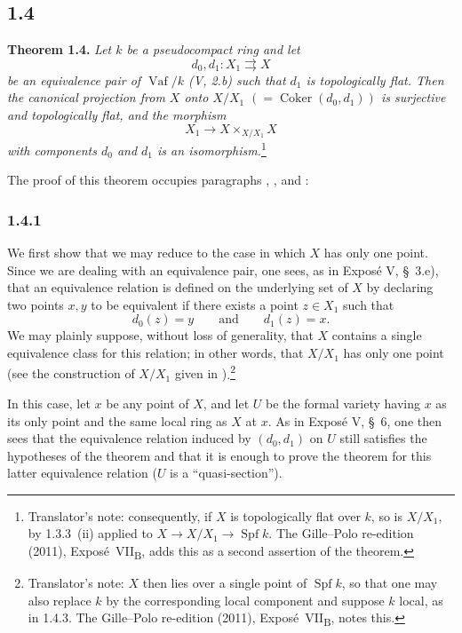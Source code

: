 
\subsection*{1.4}
\label{sga3:VIIB:1.4}

\noindent\textbf{Theorem 1.4.}
\label{sga3:VIIB:1.4.thm}
{\itshape Let \(k\) be a pseudocompact ring and let
\[
  d_0,d_1:X_1\rightrightarrows X
\]
be an equivalence pair of \(\operatorname{Vaf}/k\)
\textup{(V, 2.b)} such that \(d_1\) is topologically flat. Then the
canonical projection from \(X\) onto
\(X/X_1\) \(({}=\operatorname{Coker}(d_0,d_1))\) is surjective and
topologically flat, and the morphism
\[
  X_1\longrightarrow X\times_{X/X_1}X
\]
with components \(d_0\) and \(d_1\) is an isomorphism.}\footnote{Translator's note: consequently, if
\(X\) is topologically flat over \(k\), so is \(X/X_1\), by 1.3.3~(ii) applied to
\(X\to X/X_1\to\operatorname{Spf}k\). The Gille--Polo re-edition (2011), Expos\'e~VII\textsubscript{B}, adds
this as a second assertion of the theorem.}

The proof of this theorem occupies paragraphs ,
, and :

\subsubsection*{1.4.1}
\label{sga3:VIIB:1.4.1}

We first show that we may reduce to the case in which \(X\) has only
one point. Since we are dealing with an equivalence pair, one sees,
as in Expos\'e V, \S~3.e), that an equivalence relation is defined on
the underlying set of \(X\) by declaring two points \(x,y\) to be
equivalent if there exists a point \(z\in X_1\) such that
\[
  d_0(z)=y
  \qquad\text{and}\qquad
  d_1(z)=x.
\]
We may plainly suppose, without loss of generality, that \(X\)
contains a single equivalence class for this relation; in other words,
that \(X/X_1\) has only one point \textup{(see the construction of
\(X/X_1\) given in )}.\footnote{Translator's note: \(X\) then lies over a
single point of \(\operatorname{Spf}k\), so that one may also replace \(k\) by the corresponding local
component and suppose \(k\) local, as in 1.4.3. The Gille--Polo re-edition (2011),
Expos\'e~VII\textsubscript{B}, notes this.}

In this case, let \(x\) be any point of \(X\), and let \(U\) be the
formal variety having \(x\) as its only point and the same local ring
as \(X\) at \(x\). As in Expos\'e V, \S~6, one then sees that the
equivalence relation induced by \((d_0,d_1)\) on \(U\) still satisfies
the hypotheses of the theorem and that it is enough to prove the
theorem for this latter equivalence relation \textup{(\(U\) is a
``quasi-section'')}.

